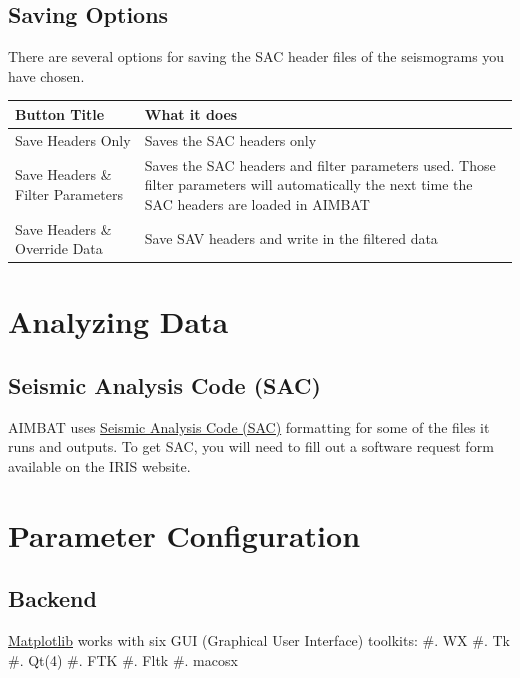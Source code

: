 \documentclass[letterpaper,10pt,english]{sphinxmanual}
\begin{document}
\section{Saving Options}
\label{docfiles/filteringData:saving-options}
There are several options for saving the SAC header files of the seismograms you have chosen.

\begin{tabulary}{\linewidth}{|L|L|}
\hline
\textsf{\relax 
Button Title
} & \textsf{\relax 
What it does
}\\
\hline
Save Headers Only
 & 
Saves the SAC headers only
\\

Save Headers \& Filter Parameters
 & 
Saves the SAC headers and filter parameters used.
Those filter parameters will automatically the
next time the SAC headers are loaded in AIMBAT
\\

Save Headers \& Override Data
 & 
Save SAV headers and write in the filtered data
\\
\hline\end{tabulary}



\chapter{Analyzing Data}
\label{docfiles/analyzingData:analyzing-data}\label{docfiles/analyzingData::doc}

\section{Seismic Analysis Code (SAC)}
\label{docfiles/analyzingData:seismic-analysis-code-sac}
AIMBAT uses \href{http://www.iris.edu/files/sac-manual/}{Seismic Analysis Code (SAC)} formatting for some of the files it runs and outputs. To get SAC, you will need to fill out a software request form available on the IRIS website.


\chapter{Parameter Configuration}
\label{docfiles/parameterConfiguration:parameter-configuration}\label{docfiles/parameterConfiguration::doc}

\section{Backend}
\label{docfiles/parameterConfiguration:backend}
\href{http://matplotlib.org/contents.html}{Matplotlib} works with six GUI (Graphical User Interface) toolkits:
\#. WX
\#. Tk
\#. Qt(4)
\#. FTK
\#. Fltk
\#. macosx
\end{document}

